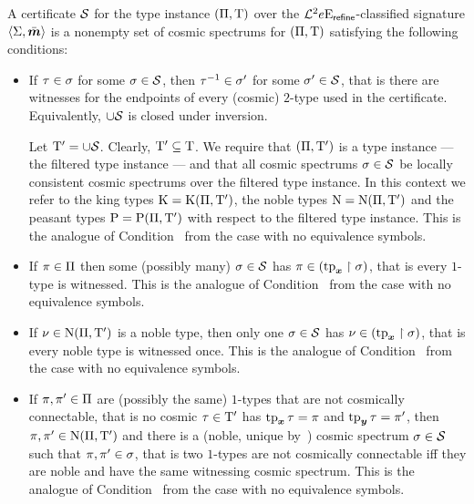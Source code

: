 \begin{definition}
A certificate $\mathcal{S}$ for the type instance $(\Pi,\mathrm{T})$ over the
$\mathcal{L}^{2}{e}\mathrm{E}_{\mathsf{refine}}$-classified signature $\left\langle \mathrm{\Sigma},\bar{\bm{m}} \right\rangle$ is a nonempty
set of cosmic spectrums for $(\Pi,\mathrm{T})$ satisfying the following
conditions:
\begin{itemize}
  \item[\certcondIp]\label{cond:cert-Ip}
  If $\tau \in \sigma$ for some $\sigma \in \mathcal{S}$, then
  $\tau^{-1} \in {\sigma'}$ for some ${\sigma'} \in \mathcal{S}$, that is there are
  witnesses for the endpoints of every (cosmic) $2$-type used in the
  certificate. Equivalently, $\cup\mathcal{S}$ is closed under inversion.
  
  Let ${\mathrm{T}'} = \cup\mathcal{S}$. Clearly, ${\mathrm{T}'} \subseteq \mathrm{T}$. We require that
  $(\Pi,{\mathrm{T}'})$ is a type instance --- the filtered type instance --- and
  that all cosmic spectrums $\sigma \in \mathcal{S}$ be locally consistent cosmic
  spectrums over the filtered type instance. In this context we refer to the king types $\mathrm{K} =
  \mathrm{K}(\Pi,{\mathrm{T}'})$, the noble types $\mathrm{\mathrm{N}} = \mathrm{\mathrm{N}}(\Pi,{\mathrm{T}'})$ and the peasant
  types $\mathrm{P} = \mathrm{P}(\Pi,{\mathrm{T}'})$ with respect to the filtered type instance.
  This is the analogue of Condition~ from the case with no
  equivalence symbols.
  \item[\certcondIIp]\label{cond:cert-IIp}
  If $\pi \in \Pi$ then some (possibly many) $\sigma
  \in \mathcal{S}$ has $\pi \in (\operatorname{tp}_{\bm{x}}\restriction\sigma)$, that is every
  $1$-type is witnessed. This is the analogue of
  Condition~ from the case with no equivalence symbols.
  \item[\certcondIIIp]\label{cond:cert-IIIp}
  If $\nu \in \mathrm{\mathrm{N}}(\Pi,{\mathrm{T}'})$ is a noble type, then only one $\sigma \in
  \mathcal{S}$ has $\nu \in (\operatorname{tp}_{\bm{x}}\restriction\sigma)$, that is every noble type is
  witnessed once. This is the analogue of Condition~ from the case
  with no equivalence symbols.
  \item[\certcondIVp]\label{cond:cert-IVp}
  If $\pi,{\pi'} \in \Pi$ are (possibly the same) $1$-types that are not
  cosmically connectable, that is no cosmic $\tau \in {\mathrm{T}'}$ has $\operatorname{tp}_{\bm{x}}\tau =
  \pi$ and $\operatorname{tp}_{\bm{y}}\tau = {\pi'}$, then $\pi, {\pi'} \in \mathrm{\mathrm{N}}(\Pi,{\mathrm{T}'})$ and
  there is a (noble, unique by~) cosmic spectrum $\sigma \in
  \mathcal{S}$ such that $\pi, {\pi'} \in \sigma$, that is two $1$-types are not
   cosmically connectable iff they are noble and have the same witnessing cosmic
   spectrum. This is the analogue of Condition~ from the case with
   no equivalence symbols.
\end{itemize}
\end{definition}
